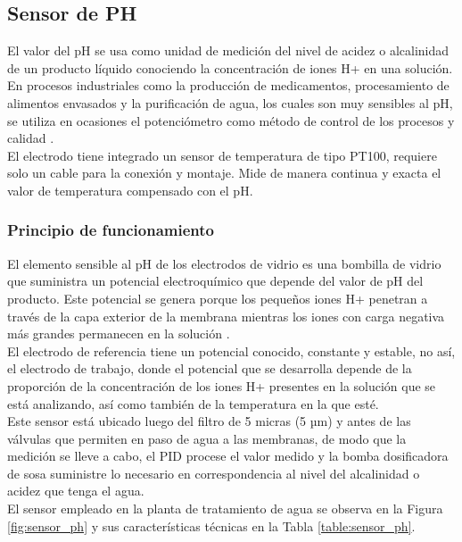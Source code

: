 \subsection{Sensor de PH}

El valor del pH se usa como unidad de medición del nivel de acidez o
alcalinidad de un producto líquido conociendo la concentración de iones H+ en
una solución.\\

En procesos industriales como la producción de medicamentos,
procesamiento de alimentos envasados y la purificación de agua, los cuales son
muy sensibles al pH, se utiliza en ocasiones el potenciómetro como método de
control de los procesos y calidad .\\

El electrodo tiene integrado un sensor de temperatura de tipo PT100,
requiere solo un cable para la conexión y montaje. Mide de manera continua y
exacta el valor de temperatura compensado con el pH.\\

\subsubsection*{Principio de funcionamiento}

El elemento sensible al pH de los electrodos de vidrio es una bombilla de
vidrio que suministra un potencial electroquímico que depende del valor de pH
del producto. Este potencial se genera porque los pequeños iones H+ penetran
a través de la capa exterior de la membrana mientras los iones con carga
negativa más grandes permanecen en la solución .\\

El electrodo de referencia tiene un potencial conocido, constante y
estable, no así, el electrodo de trabajo, donde el potencial que se desarrolla
depende de la proporción de la concentración de los iones H+ presentes en la
solución que se está analizando, así como también de la temperatura en la que
esté.\\

Este sensor está ubicado luego del filtro de 5 micras (5 µm) y antes de las
válvulas que permiten en paso de agua a las membranas, de modo que la
medición se lleve a cabo, el PID procese el valor medido y la bomba dosificadora
de sosa suministre lo necesario en correspondencia al nivel del alcalinidad o
acidez que tenga el agua.\\

El sensor empleado en la planta de tratamiento de agua se observa en la
Figura \ref{fig:sensor_ph} y sus características técnicas en la Tabla \ref{table:sensor_ph}.

